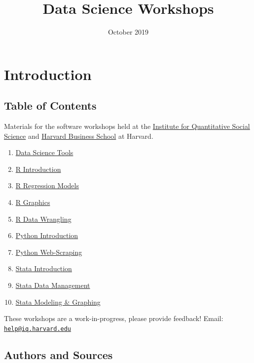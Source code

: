 \documentclass[]{book}
\title{Data Science Workshops}
\author{}
\date{October 2019}
\providecommand{\tightlist}{%
  \setlength{\itemsep}{0pt}\setlength{\parskip}{0pt}}
\begin{document}
\maketitle

{
\setcounter{tocdepth}{1}
\tableofcontents
}
\chapter*{Introduction}\label{introduction}

\section*{Table of Contents}\label{table-of-contents}

Materials for the software workshops held at the
\href{http://iq.harvard.edu}{Institute for Quantitative Social Science}
and \href{https://training.rcs.hbs.org}{Harvard Business School} at
Harvard.

\begin{enumerate}
\def\labelenumi{\arabic{enumi}.}
\tightlist
\item
  \href{./DataScienceTools.html}{Data Science Tools}
\item
  \href{./Rintro.html}{R Introduction}
\item
  \href{./Rmodels.html}{R Regression Models}
\item
  \href{./Rgraphics.html}{R Graphics}
\item
  \href{./RDataWrangling.html}{R Data Wrangling}
\item
  \href{./PythonIntro.html}{Python Introduction}
\item
  \href{./PythonWebScrape.html}{Python Web-Scraping}
\item
  \href{./StataIntro.html}{Stata Introduction}
\item
  \href{./StataDatMan.html}{Stata Data Management}
\item
  \href{./StataModGraph.html}{Stata Modeling \& Graphing}
\end{enumerate}

These workshops are a work-in-progress, please provide feedback! Email:
\href{mailto:help@iq.harvard.edu}{\nolinkurl{help@iq.harvard.edu}}

\section*{Authors and Sources}\label{authors-and-sources}
\end{document}
